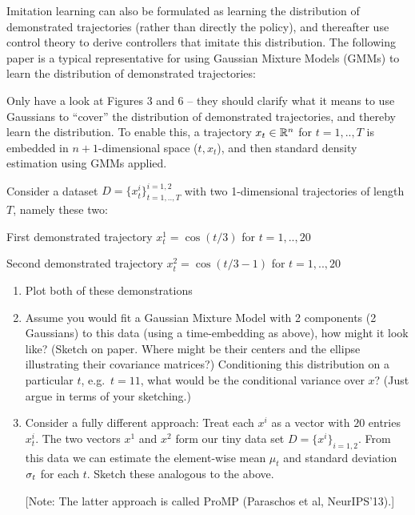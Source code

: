 

Imitation learning can also be formulated as learning the distribution of demonstrated trajectories (rather than directly the policy), and thereafter use control theory to derive controllers that imitate this distribution. The following paper is a typical representative for using Gaussian Mixture Models (GMMs) to learn the distribution of demonstrated trajectories:


Only have a look at Figures 3 and 6 -- they should clarify what it means to use Gaussians to ``cover'' the distribution of demonstrated trajectories, and thereby learn the distribution. To enable this, a trajectory $x_t\in{\mathbb{R}}^n$ for $t=1,..,T$ is embedded in $n+1$-dimensional space ($t, x_t$), and then standard density estimation using GMMs applied.

Consider a dataset $D=\{x_t^i\}^{i=1,2}_{t=1,..,T}$ with two 1-dimensional trajectories of length $T$, namely these two:
\begin{items}
\item First demonstrated trajectory $x^1_t = \cos(t/3)$ for $t=1,..,20$
\item Second demonstrated trajectory $x^2_t = \cos(t/3-1)$ for $t=1,..,20$
\end{items}
\begin{enumerate}
\item Plot both of these demonstrations

\item Assume you would fit a Gaussian Mixture Model with 2 components (2 Gaussians) to this data (using a time-embedding as above), how might it look like? (Sketch on paper. Where might be their centers and the ellipse illustrating their covariance matrices?) Conditioning this distribution on a particular $t$, e.g.\ $t=11$, what would be the conditional variance over $x$? (Just argue in terms of your sketching.)


\item Consider a fully different approach: Treat each $x^i$ as a vector with $20$ entries $x^i_t$. The two vectors $x^1$ and $x^2$ form our tiny data set $D=\{x^i\}_{i=1,2}$. From this data we can estimate the element-wise mean $\mu_t$ and standard deviation $\sigma_t$ for each $t$. Sketch these analogous to the above.

[Note: The latter approach is called ProMP (Paraschos et al, NeurIPS'13).]
\end{enumerate}

